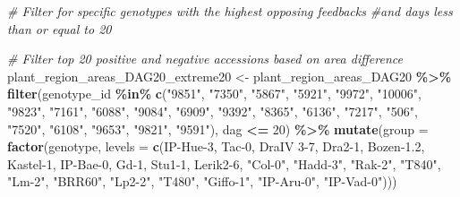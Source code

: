 \documentclass[
  11pt,
]{article}
\newenvironment{Shaded}{\begin{snugshade}}{\end{snugshade}}
\newcommand{\AttributeTok}[1]{\textcolor[rgb]{0.13,0.29,0.53}{#1}}
\newcommand{\CommentTok}[1]{\textcolor[rgb]{0.56,0.35,0.01}{\textit{#1}}}
\newcommand{\DecValTok}[1]{\textcolor[rgb]{0.00,0.00,0.81}{#1}}
\newcommand{\FunctionTok}[1]{\textcolor[rgb]{0.13,0.29,0.53}{\textbf{#1}}}
\newcommand{\NormalTok}[1]{#1}
\newcommand{\OtherTok}[1]{\textcolor[rgb]{0.56,0.35,0.01}{#1}}
\newcommand{\SpecialCharTok}[1]{\textcolor[rgb]{0.81,0.36,0.00}{\textbf{#1}}}
\newcommand{\StringTok}[1]{\textcolor[rgb]{0.31,0.60,0.02}{#1}}
\begin{document}
\begin{Shaded}
\begin{Highlighting}[]
\CommentTok{\# Filter for specific genotypes with the highest opposing feedbacks}
\CommentTok{\#and days less than or equal to 20}

\CommentTok{\# Filter top 20 positive and negative accessions based on area difference}
\NormalTok{plant\_region\_areas\_DAG20\_extreme20 }\OtherTok{\textless{}{-}}\NormalTok{ plant\_region\_areas\_DAG20 }\SpecialCharTok{\%\textgreater{}\%}
  \FunctionTok{filter}\NormalTok{(genotype\_id }\SpecialCharTok{\%in\%} \FunctionTok{c}\NormalTok{(}\StringTok{"9851"}\NormalTok{, }\StringTok{"7350"}\NormalTok{, }\StringTok{"5867"}\NormalTok{, }\StringTok{"5921"}\NormalTok{, }\StringTok{"9972"}\NormalTok{, }\StringTok{"10006"}\NormalTok{, }
                            \StringTok{"9823"}\NormalTok{, }\StringTok{"7161"}\NormalTok{, }\StringTok{"6088"}\NormalTok{, }\StringTok{"9084"}\NormalTok{, }\StringTok{"6909"}\NormalTok{, }\StringTok{"9392"}\NormalTok{, }
                            \StringTok{"8365"}\NormalTok{, }\StringTok{"6136"}\NormalTok{, }\StringTok{"7217"}\NormalTok{, }\StringTok{"506"}\NormalTok{, }\StringTok{"7520"}\NormalTok{, }\StringTok{"6108"}\NormalTok{, }
                            \StringTok{"9653"}\NormalTok{, }\StringTok{"9821"}\NormalTok{, }\StringTok{"9591"}\NormalTok{),}
\NormalTok{         dag }\SpecialCharTok{\textless{}=} \DecValTok{20}\NormalTok{) }\SpecialCharTok{\%\textgreater{}\%}
  \FunctionTok{mutate}\NormalTok{(}\AttributeTok{group =} \FunctionTok{factor}\NormalTok{(genotype, }
                        \AttributeTok{levels =} \FunctionTok{c}\NormalTok{(}\StringTok{\textquotesingle{}IP{-}Hue{-}3\textquotesingle{}}\NormalTok{, }\StringTok{\textquotesingle{}Tac{-}0\textquotesingle{}}\NormalTok{, }\StringTok{\textquotesingle{}DraIV 3{-}7\textquotesingle{}}\NormalTok{, }\StringTok{\textquotesingle{}Dra2{-}1\textquotesingle{}}\NormalTok{, }
                                   \StringTok{\textquotesingle{}Bozen{-}1.2\textquotesingle{}}\NormalTok{, }\StringTok{\textquotesingle{}Kastel{-}1\textquotesingle{}}\NormalTok{, }\StringTok{\textquotesingle{}IP{-}Bae{-}0\textquotesingle{}}\NormalTok{, }\StringTok{\textquotesingle{}Gd{-}1\textquotesingle{}}\NormalTok{, }
                                   \StringTok{\textquotesingle{}Stu1{-}1\textquotesingle{}}\NormalTok{, }\StringTok{\textquotesingle{}Lerik2{-}6\textquotesingle{}}\NormalTok{, }\StringTok{"Col{-}0"}\NormalTok{, }\StringTok{"Hadd{-}3"}\NormalTok{, }
                                   \StringTok{"Rak{-}2"}\NormalTok{, }\StringTok{"T840"}\NormalTok{, }\StringTok{"Lm{-}2"}\NormalTok{, }\StringTok{"BRR60"}\NormalTok{, }\StringTok{"Lp2{-}2"}\NormalTok{, }
                                   \StringTok{"T480"}\NormalTok{, }\StringTok{"Giffo{-}1"}\NormalTok{, }\StringTok{"IP{-}Aru{-}0"}\NormalTok{, }\StringTok{"IP{-}Vad{-}0"}\NormalTok{)))}


\end{Highlighting}
\end{Shaded}
\end{document}
